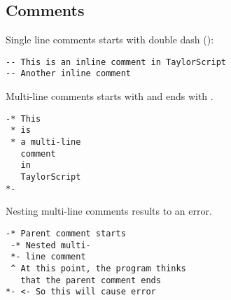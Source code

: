 \subsection{Comments}
Single line comments starts with double dash (\cd{--}):
\begin{verbatim}
-- This is an inline comment in TaylorScript
-- Another inline comment
\end{verbatim}

Multi-line comments starts with \cd{-*} and ends with \cd{*-}.
\begin{verbatim}
-* This
 * is
 * a multi-line
   comment
   in
   TaylorScript
*-
\end{verbatim}

Nesting multi-line comments results to an error.
\begin{verbatim}
-* Parent comment starts
 -* Nested multi-
 *- line comment
 ^ At this point, the program thinks
   that the parent comment ends
*- <- So this will cause error
\end{verbatim}